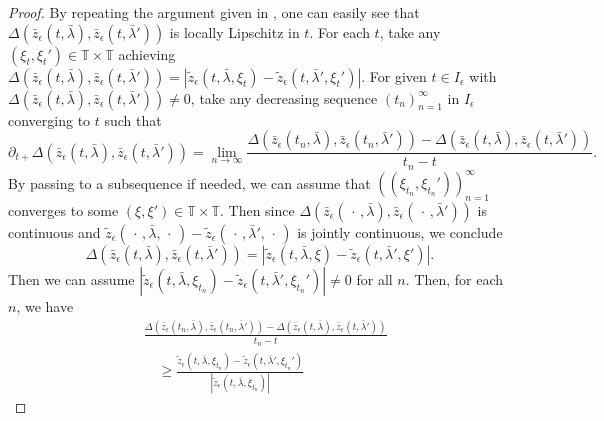 \documentclass[reqno,centertags,12pt]{amsart}
\theoremstyle{definition}
\numberwithin{equation}{section}
\newcommand{\abs}[1]{\left\lvert#1\right\rvert}
\newcommand{\seq}[1]{\left( #1 \right)}
\newcommand{\bbT}{{\mathbb{T}}}
\begin{document}
\begin{proof}
    By repeating the argument given in \cite{ConsEsch}, one can easily see that
    $\Delta(\bar{z}_{\epsilon}(t,\bar{\lambda}),\bar{z}_{\epsilon}(t,\bar{\lambda}'))$
    is locally Lipschitz in $t$. For each $t$, take any
    $(\xi_{t},\xi_{t}')\in\bbT\times\bbT$ achieving
    $\Delta(\bar{z}_{\epsilon}(t,\bar{\lambda}), \bar{z}_{\epsilon}(t,\bar{\lambda}'))
    = \abs{\tilde{z}_{\epsilon}(t,\bar{\lambda},\xi_{t})
    - \tilde{z}_{\epsilon}(t,\bar{\lambda}',\xi_{t}')}$.
    For given $t\in I_{\epsilon}$ with
    $\Delta(\bar{z}_{\epsilon}(t,\bar{\lambda}), \bar{z}_{\epsilon}(t,\bar{\lambda}')) \neq 0$,
    take any decreasing sequence
    $\seq{t_{n}}_{n=1}^{\infty}$ in $I_{\epsilon}$ converging to $t$ such that
    \[
        \partial_{t+}\Delta(\bar{z}_{\epsilon}(t,\bar{\lambda}),
        \bar{z}_{\epsilon}(t,\bar{\lambda}'))
        = \lim_{n\to\infty}
        \frac{
            \Delta(\bar{z}_{\epsilon}(t_{n},\bar{\lambda}),
            \bar{z}_{\epsilon}(t_{n},\bar{\lambda}'))
            - \Delta(\bar{z}_{\epsilon}(t,\bar{\lambda}),
            \bar{z}_{\epsilon}(t,\bar{\lambda}'))
        }{t_{n}-t}.
    \]
    By passing to a subsequence if needed, we can assume that
    $\seq{(\xi_{t_{n}},\xi_{t_{n}}')}_{n=1}^{\infty}$ converges to some
    $(\xi,\xi')\in\bbT\times\bbT$. Then since
    $\Delta(\bar{z}_{\epsilon}(\,\cdot\,,\bar{\lambda}),
    \bar{z}_{\epsilon}(\,\cdot\,,\bar{\lambda}'))$ is continuous and
    $\tilde{z}_{\epsilon}(\,\cdot\,,\bar{\lambda},\,\cdot\,)
    - \tilde{z}_{\epsilon}(\,\cdot\,,\bar{\lambda}',\,\cdot\,)$ is jointly continuous,
    we conclude
    \[
        \Delta(\bar{z}_{\epsilon}(t,\bar{\lambda}), \bar{z}_{\epsilon}(t,\bar{\lambda}'))
        = \abs{\tilde{z}_{\epsilon}(t,\bar{\lambda},\xi)
        - \tilde{z}_{\epsilon}(t,\bar{\lambda}',\xi')}.
    \]
    Then we can assume $\abs{\tilde{z}_{\epsilon}(t,\bar{\lambda},\xi_{t_{n}})
    - \tilde{z}_{\epsilon}(t,\bar{\lambda}',\xi_{t_{n}}')} \neq 0$
    for all $n$. Then, for each $n$, we have
    \begin{align*}
        &\frac{
            \Delta(\bar{z}_{\epsilon}(t_{n},\bar{\lambda}),
            \bar{z}_{\epsilon}(t_{n},\bar{\lambda}'))
            - \Delta(\bar{z}_{\epsilon}(t,\bar{\lambda}),
            \bar{z}_{\epsilon}(t,\bar{\lambda}'))
        }{t_{n}-t} \\
        &\quad\geq
        \frac{\tilde{z}_{\epsilon}(t,\bar{\lambda},\xi_{t_{n}})
        - \tilde{z}_{\epsilon}(t,\bar{\lambda}',\xi_{t_{n}}')}
        {\abs{\tilde{z}_{\epsilon}(t,\bar{\lambda},\xi_{t_{n}})
}}
\end{align*}
\end{proof}
\end{document}
